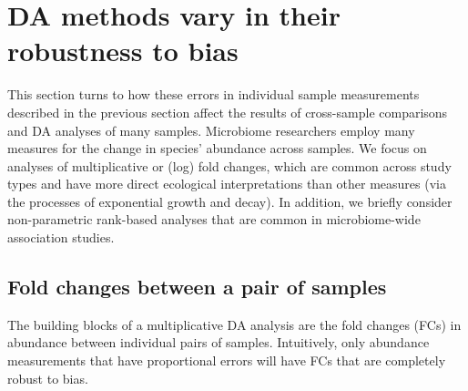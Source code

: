 \documentclass[
]{article}
\begin{document}
\hypertarget{differential-abundance}{%
\section{DA methods vary in their robustness to bias}\label{differential-abundance}}

This section turns to how these errors in individual sample measurements described in the previous section affect the results of cross-sample comparisons and DA analyses of many samples.
Microbiome researchers employ many measures for the change in species' abundance across samples.
We focus on analyses of multiplicative or (log) fold changes, which are common across study types and have more direct ecological interpretations than other measures (via the processes of exponential growth and decay).
In addition, we briefly consider non-parametric rank-based analyses that are common in microbiome-wide association studies.

\hypertarget{fold-changes-between-a-pair-of-samples}{%
\subsection{Fold changes between a pair of samples}\label{fold-changes-between-a-pair-of-samples}}

The building blocks of a multiplicative DA analysis are the fold changes (FCs) in abundance between individual pairs of samples.
Intuitively, only abundance measurements that have proportional errors will have FCs that are completely robust to bias.
\end{document}
